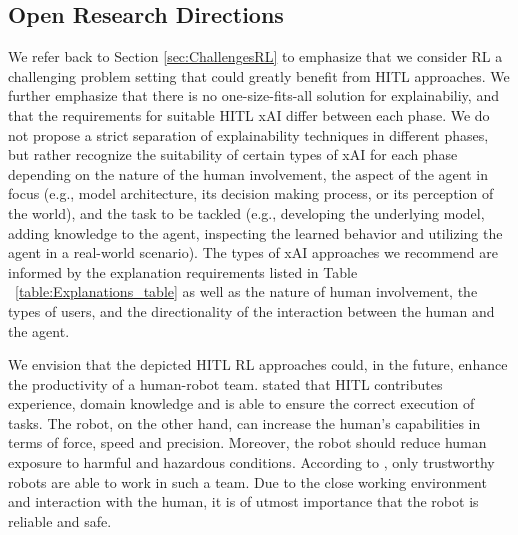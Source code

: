 \documentclass[twoside,11pt]{article}
\begin{document}
\begin{enumerate}
\subsection{Open Research Directions}

We refer back to Section \ref{sec:ChallengesRL} to emphasize that we consider RL a challenging problem setting that could greatly benefit from HITL approaches. We further emphasize that there is no one-size-fits-all solution for explainabiliy, and that the requirements for suitable HITL xAI differ between each phase. We do not propose a strict separation of explainability techniques in different phases, but rather recognize the suitability of certain types of xAI for each phase depending on the nature of the human involvement, the aspect of the agent in focus (e.g., model architecture, its decision making process, or its perception of the world), and the task to be tackled (e.g., developing the underlying model, adding knowledge to the agent, inspecting the learned behavior and utilizing the agent in a real-world scenario). The types of xAI approaches we recommend are informed by the explanation requirements listed in Table ~\ref{table:Explanations_table} as well as the nature of human involvement, the types of users, and the directionality of the interaction between the human and the agent.

We envision that the depicted HITL RL approaches could, in the future, enhance the productivity of a human-robot team. \citet{KhatibEtAl:1999:RihEnvironment} stated that HITL contributes experience, domain knowledge and is able to ensure the correct execution of tasks. The robot, on the other hand, can increase the human's capabilities in terms of force, speed and precision. Moreover, the robot should reduce human exposure to harmful and hazardous conditions. According to \citet{DeSaintsEtAl:2008:phri}, only trustworthy robots are able to work in such a team. Due to the close working environment and interaction with the human, it is of utmost importance that the robot is reliable and safe.



\end{enumerate}
\end{document}
